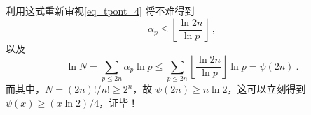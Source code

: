 利用这式重新审视\autoref{eq_tpont_4} 将不难得到
\begin{equation}
\alpha_p \le \left \lfloor \frac{\ln 2n}{\ln p} \right \rfloor ~,
\end{equation}
以及
\begin{equation}
\ln N = \sum_{p \le 2n} \alpha_p \ln p \le \sum_{p \le 2n} \left\lfloor \frac{\ln 2n}{\ln p}  \right \rfloor \ln p= \psi(2n) ~.
\end{equation}
而其中，$N = (2n)!/n! \ge 2^n$，故 $\psi(2n) \ge n \ln 2$，这可以立刻得到 $\psi(x) \ge (x \ln 2)/4$，证毕！




